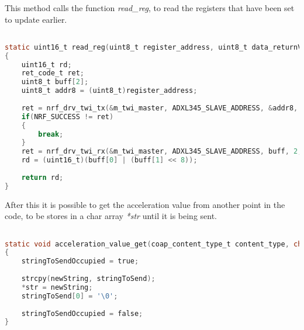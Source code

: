 This method calls the function \textit{read\_reg}, to read the registers that have been set to update earlier. 

\begin{lstlisting}[language=C]

static uint16_t read_reg(uint8_t register_address, uint8_t data_returnValue) 
{
	uint16_t rd;
	ret_code_t ret;
	uint8_t buff[2];
    uint8_t addr8 = (uint8_t)register_address;
    
    ret = nrf_drv_twi_tx(&m_twi_master, ADXL345_SLAVE_ADDRESS, &addr8, 1, true);
    if(NRF_SUCCESS != ret)
    {
        break;
    }
    ret = nrf_drv_twi_rx(&m_twi_master, ADXL345_SLAVE_ADDRESS, buff, 2, false);
	rd = (uint16_t)(buff[0] | (buff[1] << 8));
    
    return rd;	
}

\end{lstlisting}

After this it is possible to get the acceleration value from another point in the code, to be stores in a char array \textit{*str} until it is being sent. 


\begin{lstlisting}[language=C]

static void acceleration_value_get(coap_content_type_t content_type, char ** str)
{
	stringToSendOccupied = true; 
	
	strcpy(newString, stringToSend);
	*str = newString;
	stringToSend[0] = '\0';
	
	stringToSendOccupied = false; 
}


\end{lstlisting}

